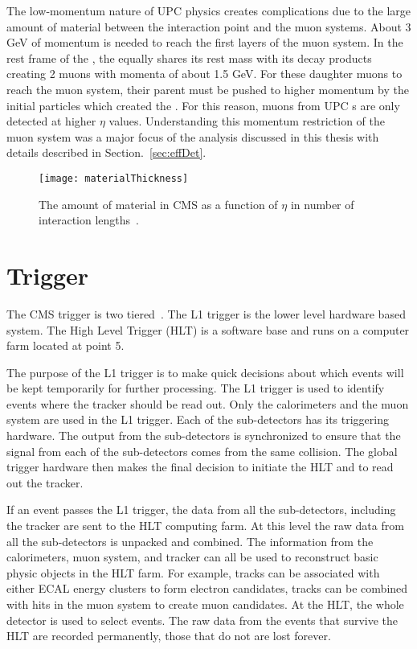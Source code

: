     The low-momentum nature of UPC physics creates complications due to the 
      large amount of material between the interaction point and the muon 
      systems.
    About 3 GeV of momentum is needed to reach the first layers of the muon 
      system.
    In the rest frame of the \JPsi{}, the \JPsi{} equally shares its rest mass with 
      its decay products creating 2 muons with momenta of about 1.5 GeV.
    For these daughter muons to reach the muon system, their parent \JPsi{} must
      be pushed to higher momentum by the initial particles which created the
      \JPsi{}.
    For this reason, muons from UPC \JPsi{}s are only detected at higher 
      $\eta$ values.
    Understanding this momentum restriction of the muon system was a major 
      focus of the analysis discussed in this thesis with details described in 
      Section.~\ref{sec:effDet}.
    \begin{figure}[!Hhbt]
      \centering
      \texttt{[image: materialThickness]}
      \caption{The amount of material in CMS as a function of $\eta$ in 
        number of interaction lengths~\cite{tCmsE}.}
      \label{fig:matThick}
    \end{figure}
 
  \section{\label{sec:detTrg}Trigger}
    The CMS trigger is two tiered~\cite{Dasu:2000ge,Sphicas:2002gg}. 
    The L1 trigger is the lower level hardware based system. 
    The High Level Trigger (HLT) is a software base and runs on a computer farm
      located at point 5.

    The purpose of the L1 trigger is to make quick decisions about which events
      will be kept temporarily for further processing.
    The L1 trigger is used to identify events where the tracker should be read
      out.
    Only the calorimeters and the muon system are used in the L1 trigger.
    Each of the sub-detectors has its triggering hardware.
    The output from the sub-detectors is synchronized to ensure that the signal
      from each of the sub-detectors comes from the same collision. 
    The global trigger hardware then makes the final decision to initiate the 
      HLT and to read out the tracker. 

    If an event passes the L1 trigger, the data from all the sub-detectors,
      including the tracker are sent to the HLT computing farm. 
    At this level the raw data from all the sub-detectors is unpacked and 
      combined.
    The information from the calorimeters, muon system, and tracker can all 
      be used to reconstruct basic physic objects in the HLT farm. 
    For example, tracks can be associated with either ECAL energy clusters to 
      form electron candidates, tracks can be combined with hits in the muon
      system to create muon candidates.
    At the HLT, the whole detector is used to select events.
    The raw data from the events that survive the HLT are recorded permanently,
      those that do not are lost forever. 

